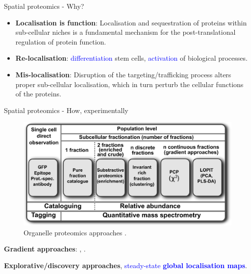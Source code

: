 \begin{frame}{Spatial proteomics - Why?}

  \begin{itemize}

  \item \textbf{Localisation is function}: Localisation and
    sequestration of proteins within sub-cellular niches is a
    fundamental mechanism for the post-translational regulation of
    protein function.

    \bigskip
      
  \item \textbf{Re-localisation}: \textcolor{Blue}{differentiation}
    stem cells, \textcolor{Blue}{activation} of biological processes.

    \bigskip
    
  \item \textbf{Mis-localisation}: Disruption of the
    targeting/trafficking process alters proper sub-cellular
    localisation, which in turn perturb the cellular functions of the
    proteins.
    
  \end{itemize}
  
\end{frame}



\begin{frame}{Spatial proteomics - How, experimentally}
  \begin{figure}
    \includegraphics[width=.8\linewidth]{figs_all/F02-expdesigns.pdf}
    \caption{Organelle proteomics approaches
      \citep{Gatto:2010}.}
  \end{figure}

  \textbf{Gradient approaches}: \cite{Dunkley:2006},
  \cite{Foster2006}.

  \bigskip

  \textbf{Explorative/discovery approaches},
  \textcolor{Blue}{steady-state \textbf{global localisation maps}}.
\end{frame}


